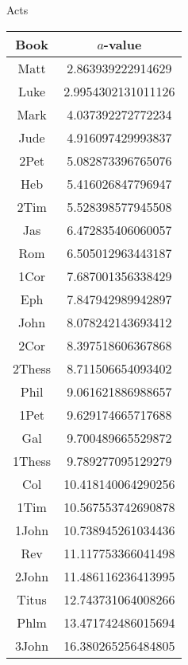 \documentclass[12pt,letterpaper]{article}
\begin{document}
Acts
\begin{longtable}{|c|c|}
\hline
 Book & $a$-value \\ \hline
Matt & 2.863939222914629 \\ \hline
 Luke & 2.9954302131011126 \\ \hline
 Mark & 4.037392272772234 \\ \hline
 Jude & 4.916097429993837 \\ \hline
 2Pet & 5.082873396765076 \\ \hline
 Heb & 5.416026847796947 \\ \hline
 2Tim & 5.528398577945508 \\ \hline
 Jas & 6.472835406060057 \\ \hline
 Rom & 6.505012963443187 \\ \hline
 1Cor & 7.687001356338429 \\ \hline
 Eph & 7.847942989942897 \\ \hline
 John & 8.078242143693412 \\ \hline
 2Cor & 8.397518606367868 \\ \hline
 2Thess & 8.711506654093402 \\ \hline
 Phil & 9.061621886988657 \\ \hline
 1Pet & 9.629174665717688 \\ \hline
 Gal & 9.700489665529872 \\ \hline
 1Thess & 9.789277095129279 \\ \hline
 Col & 10.418140064290256 \\ \hline
 1Tim & 10.567553742690878 \\ \hline
 1John & 10.738945261034436 \\ \hline
 Rev & 11.117753366041498 \\ \hline
 2John & 11.486116236413995 \\ \hline
 Titus & 12.743731064008266 \\ \hline
 Phlm & 13.471742486015694 \\ \hline
 3John & 16.380265256484805 \\ \hline 
\end{longtable}
\end{document}
